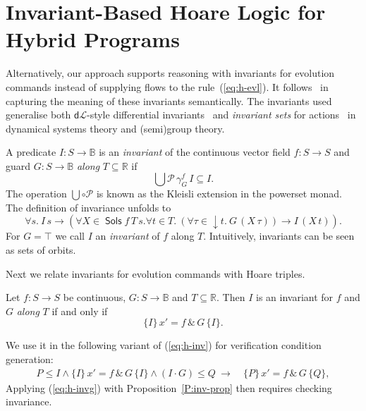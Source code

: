 \documentclass[envcountsame]{llncs}
\newcommand{\dL}{\mathsf{d}\mathcal{L}}
\newcommand{\Pow}{\mathcal{P}}
\newcommand{\reals}{\mathbb{R}}
\newcommand{\bools}{\mathbb{B}}
\newcommand{\Sols}{\mathop{\mathsf{Sols}}}
\newcommand\notein[3]{\todo[inline,linecolor=orange!80!black,backgroundcolor=#2!20]{#1: #3}%
}
\newcommand{\gin}[1]{\notein{{\bf GS}}{gcolor}{#1}}
\begin{document}
\gin{add example: thermostat (done)}



\section{Invariant-Based Hoare Logic for Hybrid Programs}\label{sec:hoare-inv}

Alternatively, our approach supports reasoning with invariants for
evolution commands instead of supplying flows to the
rule~(\ref{eq:h-evl}). It follows~\cite{MuniveS19} in capturing the
meaning of these invariants semantically. The invariants used
generalise both $\dL$-style differential invariants~\cite{Platzer12}
and \emph{invariant sets} for actions~\cite{Teschl12} in dynamical
systems theory and (semi)group theory.

A predicate $I:S\to\bools$ is an \emph{invariant} of the continuous
vector field $f:S\to S$ and guard $G:S\to\bools$ \emph{along}
$T\subseteq \reals$ if
\begin{equation*}
\bigcup \Pow\, \gamma^f_G\, I\subseteq  I.
\end{equation*}
The operation $\bigcup\circ\Pow$ is known as the Kleisli extension in
the powerset monad. The definition of invariance unfolds to
\begin{equation*}
  \forall s.\ I\, s \to (\forall X\in\Sols f\, T\, s.\forall t\in T.\ (\forall \tau\in {\downarrow}t.\ G\, (X\, \tau)) \to I\, (X\, t)).
\end{equation*}
For $G=\top$ we call $I$ an \emph{invariant} of $f$ along $T$.
Intuitively, invariants can be seen as sets of orbits.

Next we relate invariants for evolution commands with Hoare triples.
\begin{proposition}\label{P:inv-prop}
  Let $f:S\to S$ be continuous, $G:S\to\bools$ and
  $T\subseteq \reals$. Then $I$ is an invariant for $f$ and $G$ \emph{along} $T$ if and only if
\begin{equation*}
 \{I\}\, x' = f\, \&\, G\, \{I\}.
\end{equation*}
\end{proposition}
We use it in the following variant of (\ref{eq:h-inv}) for verification condition generation:
\begin{align}
  P\le I \land \{I\}\, x' = f\, \&\, G\, \{I\}\land (I\cdot G)\le Q\ \rightarrow\
  &\{P\}\, x' = f\, \&\, G\, \{Q\},\label{eq:h-invg}\tag{h-invg}
\end{align}
Applying (\ref{eq:h-invg}) with Proposition~\ref{P:inv-prop} then requires checking invariance.
\end{document}
